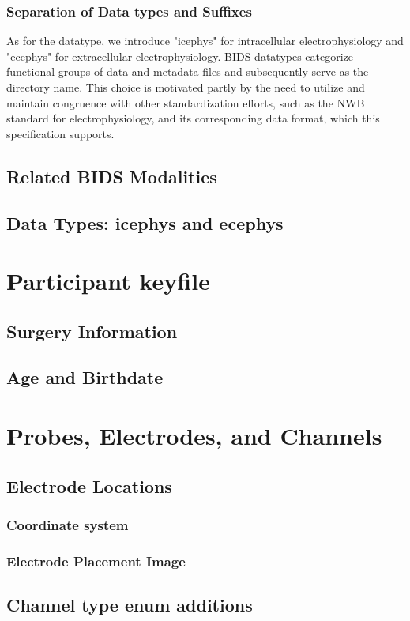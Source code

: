 \documentclass[fleqn,10pt]{wlscirep}
\begin{document}
\subsubsection*{Separation of Data types and Suffixes}
As for the datatype, we introduce "icephys" for intracellular electrophysiology and "ecephys" for extracellular electrophysiology. BIDS datatypes categorize functional groups of data and metadata files and subsequently serve as the directory name. This choice is motivated partly by the need to utilize and maintain congruence with other standardization efforts, such as the NWB standard for electrophysiology, and its corresponding data format, which this specification supports.

\subsection*{Related BIDS Modalities}




\subsection*{Data Types: icephys and ecephys}
\section*{Participant keyfile}
\subsection*{Surgery Information}
\subsection*{Age and Birthdate}
\section*{Probes, Electrodes, and Channels}
\subsection*{Electrode Locations}
\subsubsection*{Coordinate system}
\subsubsection*{Electrode Placement Image}
\subsection*{Channel type enum additions}
\end{document}
